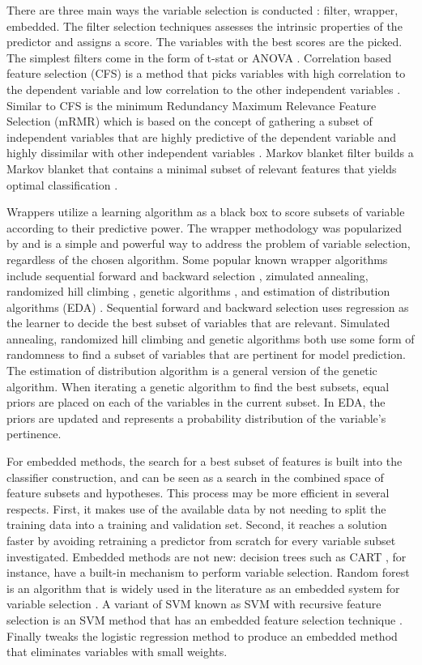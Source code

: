 \documentclass[twoside,11pt]{article}
\begin{document}
There are three main ways the variable selection is conducted \citep{Saeys07} : filter, wrapper, embedded. The filter selection techniques assesses the intrinsic properties of the predictor and assigns a score. The variables with the best scores are the picked. The simplest filters come in the form of t-stat or ANOVA  \citep{Jafari06}. Correlation based feature selection (CFS) is a method that picks variables with high correlation to the dependent variable and low correlation to the other independent variables \citep{Hall99}. Similar to CFS is the minimum Redundancy Maximum Relevance Feature Selection (mRMR) which is based on the concept of gathering a subset of independent variables that are highly predictive of the dependent variable and highly dissimilar with other independent variables \citep{Ding03}. Markov blanket filter builds a Markov blanket that contains a minimal subset of relevant features that yields optimal classification \citep{Zeng09}. 

Wrappers utilize a learning algorithm as a black box to score subsets of variable according to their predictive power. The wrapper methodology was popularized by \citet{Kohavi96} and is a simple and powerful way to address the problem of variable selection, regardless of the chosen algorithm. Some popular known wrapper algorithms include sequential forward and backward selection \citep{Kittler78}, zimulated annealing\citep{Kirkpatrick83}, randomized hill climbing \citep{Skalak94}, genetic algorithms \citep{Holland75}, and estimation of distribution algorithms (EDA) \citep{Blanco04}. Sequential forward and backward selection uses regression as the learner to decide the best subset of variables that are relevant. Simulated annealing, randomized hill climbing and genetic algorithms both use some form of randomness to find a subset of variables that are pertinent for model prediction. The estimation of distribution algorithm is a general version of the genetic algorithm. When iterating a genetic algorithm to find the best subsets, equal priors are placed on each of the variables in the current subset. In EDA, the priors are updated and represents a probability distribution of the variable's pertinence. 

For embedded methods, the search for a best subset of features is built into the classifier construction, and can be seen as a search in the combined space of feature subsets and hypotheses. This process may be more efficient in several respects. First, it makes use of the available data by not needing to split the training data into a training and validation set. Second, it reaches a solution faster by avoiding retraining a predictor from scratch for every variable subset investigated. Embedded methods are not new: decision trees such as CART \citep{Breiman84}, for instance, have a built-in mechanism to perform variable selection. Random forest is an algorithm that is widely used in the literature as an embedded system for variable selection \citep{Diaz06}\citep{Jiang04}. A variant of SVM known as SVM with recursive feature selection is an SVM method that has an embedded feature selection technique \citep{Guyon02}. Finally \citet{Ma05} tweaks the logistic regression method to produce an embedded method that eliminates variables with small weights.
\end{document}
